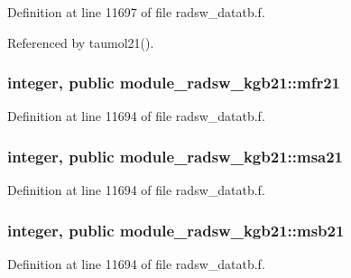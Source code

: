 Definition at line 11697 of file radsw\+\_\+datatb.\+f.



Referenced by taumol21().

\subsubsection[{\texorpdfstring{mfr21}{mfr21}}]{\setlength{\rightskip}{0pt plus 5cm}integer, public module\+\_\+radsw\+\_\+kgb21\+::mfr21}\hypertarget{namespacemodule__radsw__kgb21_a5575239aa9d55abcca1ac1f82dc4c4ec}{}\label{namespacemodule__radsw__kgb21_a5575239aa9d55abcca1ac1f82dc4c4ec}


Definition at line 11694 of file radsw\+\_\+datatb.\+f.

\subsubsection[{\texorpdfstring{msa21}{msa21}}]{\setlength{\rightskip}{0pt plus 5cm}integer, public module\+\_\+radsw\+\_\+kgb21\+::msa21}\hypertarget{namespacemodule__radsw__kgb21_a235b17e9b4b37668028c572f80e1188a}{}\label{namespacemodule__radsw__kgb21_a235b17e9b4b37668028c572f80e1188a}


Definition at line 11694 of file radsw\+\_\+datatb.\+f.

\subsubsection[{\texorpdfstring{msb21}{msb21}}]{\setlength{\rightskip}{0pt plus 5cm}integer, public module\+\_\+radsw\+\_\+kgb21\+::msb21}\hypertarget{namespacemodule__radsw__kgb21_a59710ca5b31c30385ea968c0f01e2e81}{}\label{namespacemodule__radsw__kgb21_a59710ca5b31c30385ea968c0f01e2e81}


Definition at line 11694 of file radsw\+\_\+datatb.\+f.

